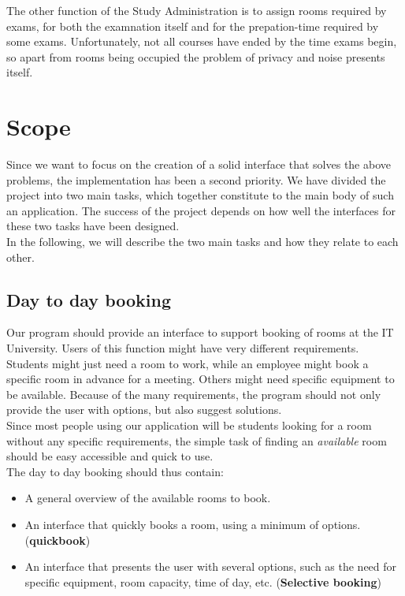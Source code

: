 The other function of the Study Administration is to assign rooms required by exams, for both the examnation itself and for the prepation-time required by some exams. Unfortunately, not all courses have ended by the time exams begin, so apart from rooms being occupied the problem of privacy and noise presents itself.\\

\label{sec:scope}
\section{Scope}
 Since we want to focus on the creation of a solid interface that solves the above problems, the implementation has been a second priority. We have divided the project into two main tasks, which together constitute to the main body of such an application. The success of the project depends on how well the interfaces for these two tasks have been designed.\\
In the following, we will describe the two main tasks and how they relate to each other.

\subsection{Day to day booking}
Our program should provide an interface to support booking of rooms at the IT University. Users of this function might have very different requirements. Students might just need a room to work, while an employee might book a specific room in advance for a meeting. Others might need specific equipment to be available. Because of the many requirements, the program should not only provide the user with options, but also suggest solutions.\\
Since most people using our application will be students looking for a room without any specific requirements, the simple task of finding an \emph{available} room should be easy accessible and quick to use. \\

The day to day booking should thus contain:

\begin{itemize}
	\item A general overview of the available rooms to book.
	\item An interface that quickly books a room, using a minimum of options. (\textbf{quickbook})
	\item An interface that presents the user with several options, such as the need for specific equipment, room capacity, time of day, etc. (\textbf{Selective booking})
\end{itemize}

